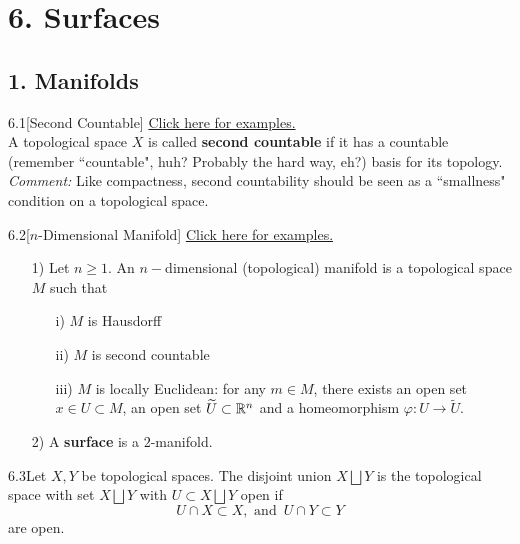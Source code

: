 \section*{6. Surfaces}

\subsection*{1. Manifolds}

\begin{customdefinition}{6.1}[Second Countable] 
\hypertarget{Definition_6.1}{\hyperlink{ex.d.6.1}{Click here for examples.}}\\
A topological space $X$ is called {\bf second countable} if it has a countable (remember ``countable", huh? Probably the hard way, eh?) basis for its topology.\\
\emph{Comment:} Like compactness, second countability should be seen as a ``smallness" condition on a topological space.
\end{customdefinition}

\begin{customdefinition}{6.2}[$n$-Dimensional Manifold] 
\hypertarget{Definition_6.2}{\hyperlink{ex.d.6.2}{Click here for examples.}}
\begin{enumerate}
    \item[1)] Let $n \geqslant 1$. An $n-$dimensional (topological) manifold is a topological space $M$ such that 
        \begin{enumerate}
            \item[i)] $M$ is Hausdorff
            \item[ii)] $M$ is second countable
            \item[iii)] $M$ is locally Euclidean: for any $m \in M$, there exists an open set $x \in U \subset M$, an open set $\widetilde{U} \subset \mathbb{R}^n$ and a homeomorphism $\varphi: U \longrightarrow \widetilde{U}$.
        \end{enumerate}
    \item[2)] A {\bf surface} is a $2$-manifold.
\end{enumerate}
\end{customdefinition}

\begin{customdefinition}{6.3}Let $X, Y$ be topological spaces. The disjoint union $X \bigsqcup Y$ is the topological space with set $X \bigsqcup Y$ with $U \subset X \bigsqcup Y$ open if 
$$U \cap X \subset X, \text{ and } \,U \cap Y \subset Y$$
are open.
\end{customdefinition}

